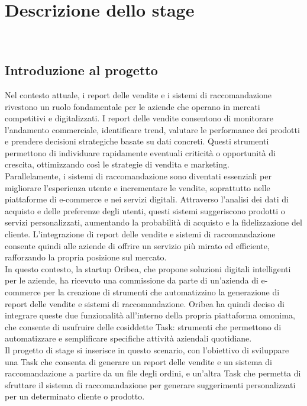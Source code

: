 \chapter{Descrizione dello stage}
\label{cap:descrizione-stage}

\\

\section{Introduzione al progetto}

Nel contesto attuale, i report delle vendite e i sistemi di raccomandazione rivestono un ruolo fondamentale per le aziende che operano in mercati competitivi e digitalizzati. I report delle vendite consentono di monitorare l’andamento commerciale, identificare trend, valutare le performance dei prodotti e prendere decisioni strategiche basate su dati concreti. Questi strumenti permettono di individuare rapidamente eventuali criticità o opportunità di crescita, ottimizzando così le strategie di vendita e marketing.\\

Parallelamente, i sistemi di raccomandazione sono diventati essenziali per migliorare l’esperienza utente e incrementare le vendite, soprattutto nelle piattaforme di e-commerce e nei servizi digitali. Attraverso l’analisi dei dati di acquisto e delle preferenze degli utenti, questi sistemi suggeriscono prodotti o servizi personalizzati, aumentando la probabilità di acquisto e la fidelizzazione del cliente. L’integrazione di report delle vendite e sistemi di raccomandazione consente quindi alle aziende di offrire un servizio più mirato ed efficiente, rafforzando la propria posizione sul mercato.\\

In questo contesto, la startup Oribea, che propone soluzioni digitali intelligenti per le aziende, ha ricevuto una commissione da parte di un'azienda di e-commerce per la creazione di strumenti che automatizzino la generazione di report delle vendite e sistemi di raccomandazione. Oribea ha quindi deciso di integrare queste due funzionalità all’interno della propria piattaforma omonima, che consente di usufruire delle cosiddette Task: strumenti che permettono di automatizzare e semplificare specifiche attività aziendali quotidiane.\\
Il progetto di stage si inserisce in questo scenario, con l'obiettivo di sviluppare una Task che consenta di generare un report delle vendite e un sistema di raccomandazione a partire da un file degli ordini, e un’altra Task che permetta di sfruttare il sistema di raccomandazione per generare suggerimenti personalizzati per un determinato cliente o prodotto.\\

